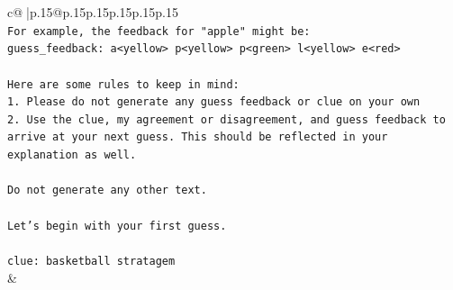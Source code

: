 \documentclass{article}
\begin{document}
{\begin{supertabular}{c@{$\;$}|p{.15\linewidth}@{}p{.15\linewidth}p{.15\linewidth}p{.15\linewidth}p{.15\linewidth}p{.15\linewidth}}
{{{\\ 
\texttt{For example, the feedback for "apple" might be:} \\
\texttt{guess\_feedback: a<yellow> p<yellow> p<green> l<yellow> e<red>} \\
\\ 
\texttt{Here are some rules to keep in mind:} \\
\texttt{1. Please do not generate any guess feedback or clue on your own} \\
\texttt{2. Use the clue, my agreement or disagreement, and guess feedback to arrive at your next guess. This should be reflected in your explanation as well.} \\
\\ 
\texttt{Do not generate any other text.} \\
\\ 
\texttt{Let's begin with your first guess.} \\
\\ 
\texttt{clue: basketball stratagem} \\
            }
        }
    }
    & \\ \\


\end{supertabular}}
\end{document}
